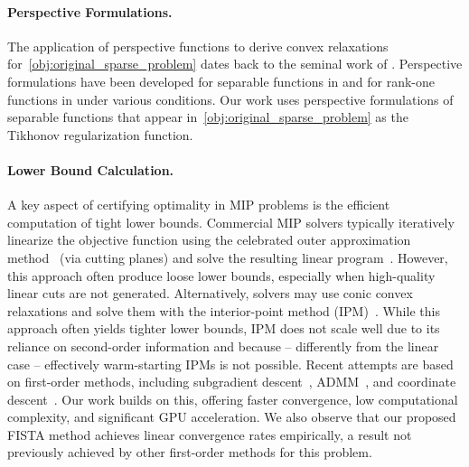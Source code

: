 \paragraph{Perspective Formulations.} 
The application of perspective functions to derive convex relaxations for~\eqref{obj:original_sparse_problem} dates back to the seminal work of \citet{ceria1999convex}.
Perspective formulations have been developed for separable functions in \citep{gunluk2010perspective, xie2020scalable, wei2022ideal, bacci2019new, shafiee2024constrained} and for rank-one functions in \citep{atamturk2020supermodularity, wei2020convexification, wei2022ideal, han2021compact, shafiee2024constrained} under various conditions. 
Our work uses perspective formulations of separable functions that appear in~\eqref{obj:original_sparse_problem} as the Tikhonov regularization function. 

\paragraph{Lower Bound Calculation.}
A key aspect of certifying optimality in MIP problems is the efficient computation of tight lower bounds.
Commercial MIP solvers typically iteratively linearize the objective function using the celebrated outer approximation method~\citep{kelley1960cutting} (via cutting planes) and solve the resulting linear program~\citep{schrijver1998theory, wolsey2020integer}.
However, this approach often produce loose lower bounds, especially when high-quality linear cuts are not generated.
Alternatively, solvers may use conic convex relaxations and solve them with the interior-point method (IPM)~\citep{dikin1967iterative, renegar2001mathematical, nesterov1994interior}. 
While this approach often yields tighter lower bounds, IPM does not scale well due to its reliance on second-order information and because -- differently from the linear case -- effectively warm-starting IPMs is not possible.
Recent attempts are based on first-order methods, including subgradient descent~\citep{bertsimas2020sparse1}, ADMM~\citep{liu2024okridge}, and coordinate descent~\citep{hazimeh2022sparse}. Our work builds on this, offering faster convergence, low computational complexity, and significant GPU acceleration. We also observe that our proposed FISTA method achieves linear convergence rates empirically, a result not previously achieved by other first-order methods for this problem.


